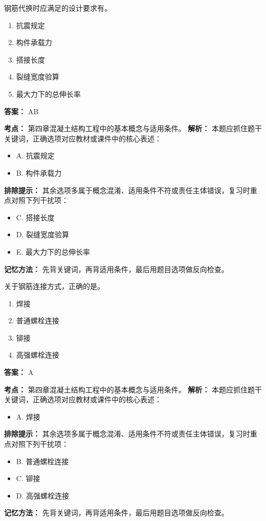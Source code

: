 \documentclass[UTF8,fontset=fandol,11pt]{ctexart}
\begin{document}
\begin{quizbox}[title={第 16 题}]
钢筋代换时应满足的设计要求有。\\
\begin{enumerate}[label=\Alph*.]
\item 抗震规定
\item 构件承载力
\item 搭接长度
\item 裂缝宽度验算
\item 最大力下的总伸长率
\end{enumerate}
\textbf{答案：} AB
\vspace{0.25em}
\begin{answerbox}[title={考点解析}]
\textbf{考点：} 第四章混凝土结构工程中的基本概念与适用条件。
\textbf{解析：} 本题应抓住题干关键词，正确选项对应教材或课件中的核心表述：
\begin{itemize}
\item A. 抗震规定
\item B. 构件承载力
\end{itemize}
\textbf{排除提示：} 其余选项多属于概念混淆、适用条件不符或责任主体错误，复习时重点对照下列干扰项：
\begin{itemize}
\item C. 搭接长度
\item D. 裂缝宽度验算
\item E. 最大力下的总伸长率
\end{itemize}
\textbf{记忆方法：} 先背关键词，再背适用条件，最后用题目选项做反向检查。
\end{answerbox}
\end{quizbox}

\vspace{0.2em}

\begin{quizbox}[title={第 17 题}]
关于钢筋连接方式，正确的是。\\
\begin{enumerate}[label=\Alph*.]
\item 焊接
\item 普通螺栓连接
\item 铆接
\item 高强螺栓连接
\end{enumerate}
\textbf{答案：} A
\vspace{0.25em}
\begin{answerbox}[title={考点解析}]
\textbf{考点：} 第四章混凝土结构工程中的基本概念与适用条件。
\textbf{解析：} 本题应抓住题干关键词，正确选项对应教材或课件中的核心表述：
\begin{itemize}
\item A. 焊接
\end{itemize}
\textbf{排除提示：} 其余选项多属于概念混淆、适用条件不符或责任主体错误，复习时重点对照下列干扰项：
\begin{itemize}
\item B. 普通螺栓连接
\item C. 铆接
\item D. 高强螺栓连接
\end{itemize}
\textbf{记忆方法：} 先背关键词，再背适用条件，最后用题目选项做反向检查。
\end{answerbox}
\end{quizbox}
\end{document}
